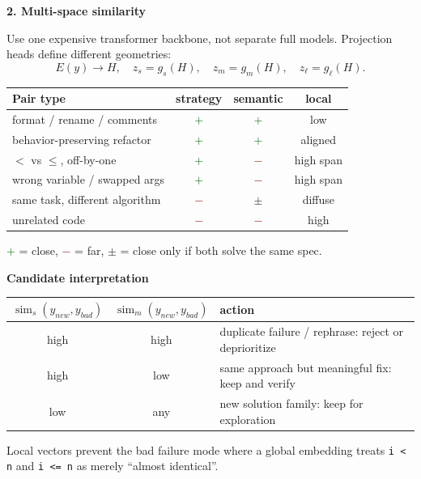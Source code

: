 \documentclass[9pt]{article}
\newcommand{\close}{\textcolor{darkgreen}{$+$}}
\newcommand{\far}{\textcolor{darkred}{$-$}}
\newcommand{\maybe}{\textcolor{orange!80!black}{$\pm$}}
\newcommand{\simfn}{\operatorname{sim}}
\begin{document}
\begin{minipage}[t]{0.335\linewidth}
\textbf{2. Multi-space similarity}\vspace{0.2em}

Use one expensive transformer backbone, not separate full models. Projection heads define different geometries:
\[
E(y)\to H,\quad z_s=g_s(H),\quad z_m=g_m(H),\quad z_\ell=g_\ell(H).
\]
\begin{center}
\scriptsize
\begin{tabularx}{\linewidth}{>{\raggedright\arraybackslash}Xccc}
\toprule
\textbf{Pair type} & \textbf{strategy} & \textbf{semantic} & \textbf{local} \\
\midrule
format / rename / comments & \close & \close & low \\
behavior-preserving refactor & \close & \close & aligned \\
$<$ vs $\le$, off-by-one & \close & \far & high span \\
wrong variable / swapped args & \close & \far & high span \\
same task, different algorithm & \far & \maybe & diffuse \\
unrelated code & \far & \far & high \\
\bottomrule
\end{tabularx}
\end{center}
\vspace{-0.2em}
\close{} = close, \far{} = far, \maybe{} = close only if both solve the same spec.

\vspace{0.3em}
\textbf{Candidate interpretation}\vspace{-0.2em}
\begin{center}
\scriptsize
\begin{tabularx}{\linewidth}{cc>{\raggedright\arraybackslash}X}
\toprule
$\simfn_s(y_{new},y_{bad})$ & $\simfn_m(y_{new},y_{bad})$ & action \\
\midrule
high & high & duplicate failure / rephrase: reject or deprioritize \\
high & low & same approach but meaningful fix: keep and verify \\
low & any & new solution family: keep for exploration \\
\bottomrule
\end{tabularx}
\end{center}

\vspace{0.2em}
Local vectors prevent the bad failure mode where a global embedding treats
\texttt{i < n} and \texttt{i <= n} as merely ``almost identical''.
\end{minipage}\hfill
\end{document}
